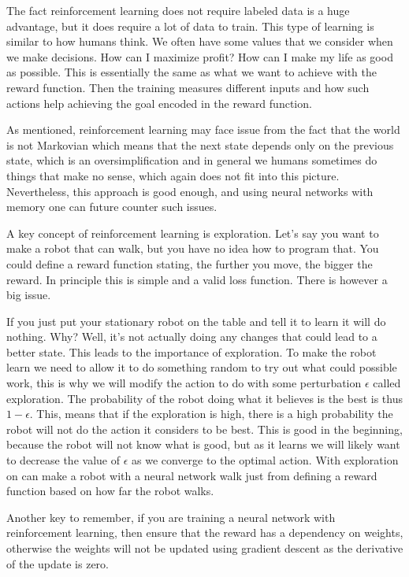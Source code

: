 \documentclass[12pt,a4paper]{article} %
\numberwithin{equation}{section}
\begin{document}
			The fact reinforcement learning does not require labeled data is a huge advantage, but it does require a lot of data to train. This type of learning is similar to how humans think. We often have some values that we consider when we make decisions. How can I maximize profit? How can I make my life as good as possible. This is essentially the same as what we want to achieve with the reward function. Then the training measures different inputs and how such actions help achieving the goal encoded in the reward function.
			
			As mentioned, reinforcement learning may face issue from the fact that the world is not Markovian which means that the next state depends only on the previous state, which is an oversimplification and in general we humans sometimes do things that make no sense, which again does not fit into this picture. Nevertheless, this approach is good enough, and using neural networks with memory one can future counter such issues. 
			
			A key concept of reinforcement learning is exploration. Let's say you want to make a robot that can walk, but you have no idea how to program that. You could define a reward function stating, the further you move, the bigger the reward. In principle this is simple and a valid loss function. There is however a big issue.
			
			If you just put your stationary robot on the table and tell it to learn it will do nothing. Why? Well, it's not actually doing any changes that could lead to a better state. This leads to the importance of exploration.
			To make the robot learn we need to allow it to do something random to try out what could possible work, this is why we will modify the action to do with some perturbation $\epsilon$ called exploration. The probability of the robot doing what it believes is the best is thus $1-\epsilon$. This, means that if the exploration is high, there is a high probability the robot will not do the action it considers to be best. This is good in the beginning, because the robot will not know what is good, but as it learns we will likely want to decrease the value of $\epsilon$ as we converge to the optimal action. With exploration on can make a robot with a neural network walk just from defining a reward function based on how far the robot walks.
			
			Another key to remember, if you are training a neural network with reinforcement learning, then ensure that the reward has a dependency on weights, otherwise the weights will not be updated using gradient descent as the derivative of the update is zero.
			
\end{document}
